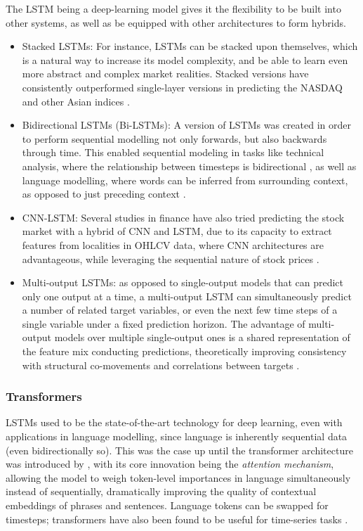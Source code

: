 \documentclass[stu,floatsintext]{apa7}
\begin{document}
The LSTM being a deep-learning model gives it the flexibility to be built into other systems, as well as be equipped with other architectures to form hybrids.

\begin{itemize}
\item Stacked LSTMs: For instance, LSTMs can be stacked upon themselves, which is a natural way to increase its model complexity, and be able to learn even more abstract and complex market realities. Stacked versions have consistently outperformed single-layer versions in predicting the NASDAQ and other Asian indices \parencite{muruganandam2022seminal}.
\item Bidirectional LSTMs (Bi-LSTMs): A version of LSTMs was created in order to perform sequential modelling not only forwards, but also backwards through time. This enabled sequential modeling in tasks like technical analysis, where the relationship between timesteps is bidirectional \parencite{rudhistiar2025hybrid}, as well as language modelling, where words can be inferred from surrounding context, as opposed to just preceding context \parencite{rahman2021bidirectional}.
\item CNN-LSTM: Several studies in finance have also tried predicting the stock market with a hybrid of CNN and LSTM, due to its capacity to extract features from localities in OHLCV data, where CNN architectures are advantageous, while leveraging the sequential nature of stock prices \parencite{liu2025hybrid}.
\item Multi-output LSTMs: as opposed to single-output models that can predict only one output at a time, a multi-output LSTM can simultaneously predict a number of related target variables, or even the next few time steps of a single variable under a fixed prediction horizon. The advantage of multi-output models over multiple single-output ones is a shared representation of the feature mix conducting predictions, theoretically improving consistency with structural co-movements and correlations between targets \parencite{kerdprasop2025multioutput}.
\end{itemize}

\subsubsection{Transformers}

LSTMs used to be the state-of-the-art technology for deep learning, even with applications in language modelling, since language is inherently sequential data (even bidirectionally so). This was the case up until the transformer architecture was introduced by \textcite{vaswani2017attention}, with its core innovation being the \textit{attention mechanism}, allowing the model to weigh token-level importances in language simultaneously instead of sequentially, dramatically improving the quality of contextual embeddings of phrases and sentences. Language tokens can be swapped for timesteps; transformers have also been found to be useful for time-series tasks \parencite{jang2025selective}.
\end{document}
